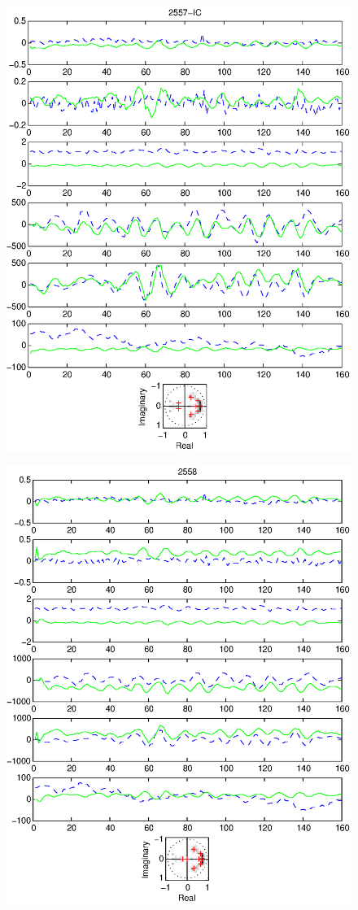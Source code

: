 \documentclass{article}
\begin{document}
\begin{figure}[htb!]\centering
\includegraphics{2557_ic.eps}
\end{figure}\clearpage
\begin{figure}[htb!]\centering
\includegraphics{2558.eps}
\end{figure}\clearpage
\end{document}
